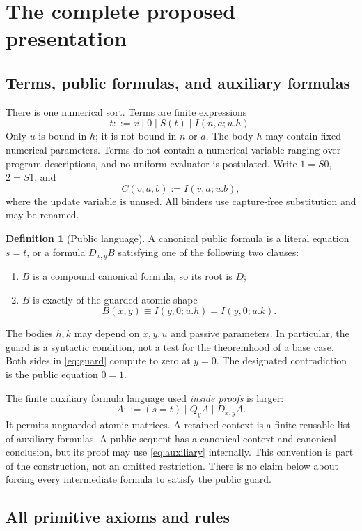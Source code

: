 \documentclass[11pt,letterpaper]{article}
\theoremstyle{definition}
\newtheorem{definition}[theorem]{Definition}
\begin{document}
\section{The complete proposed presentation}
\label{sec:calculus}

\subsection{Terms, public formulas, and auxiliary formulas}

There is one numerical sort. Terms are finite expressions
\[
 t ::= x\mid 0\mid S(t)\mid I(n,a;u.h).
\]
Only $u$ is bound in $h$; it is not bound in $n$ or $a$. The body $h$ may
contain fixed numerical parameters. Terms do not contain a numerical
variable ranging over program descriptions, and no uniform evaluator is
postulated. Write $1=S0$, $2=S1$, and
\[
 C(v,a,b):=I(v,a;u.b),
\]
where the update variable is unused. All binders use capture-free
substitution and may be renamed.

\begin{definition}[Public language]
A canonical public formula is a literal equation $s=t$, or a formula
$D_{x,y}B$ satisfying one of the following two clauses:
\begin{enumerate}
\item $B$ is a compound canonical formula, so its root is $D$;
\item $B$ is exactly of the guarded atomic shape
\[
 B(x,y)\equiv I(y,0;u.h)=I(y,0;u.k).
 \tag{G}\label{eq:guard}
\]
\end{enumerate}
The bodies $h,k$ may depend on $x,y,u$ and passive parameters. In particular,
the guard is a syntactic condition, not a test for the theoremhood of a base
case. Both sides in \eqref{eq:guard} compute to zero at $y=0$.
The designated contradiction is the public equation $0=1$.
\end{definition}

The finite auxiliary formula language used \emph{inside proofs} is larger:
\[
 A ::= (s=t)\mid Q_yA\mid D_{x,y}A.
 \tag{A}\label{eq:auxiliary}
\]
It permits unguarded atomic matrices. A retained context is a finite reusable
list of auxiliary formulas. A public sequent has a canonical context and
canonical conclusion, but its proof may use \eqref{eq:auxiliary} internally.
This convention is part of the construction, not an omitted restriction.
There is no claim below about forcing every intermediate formula to satisfy
the public guard.

\subsection{All primitive axioms and rules}
\end{document}

